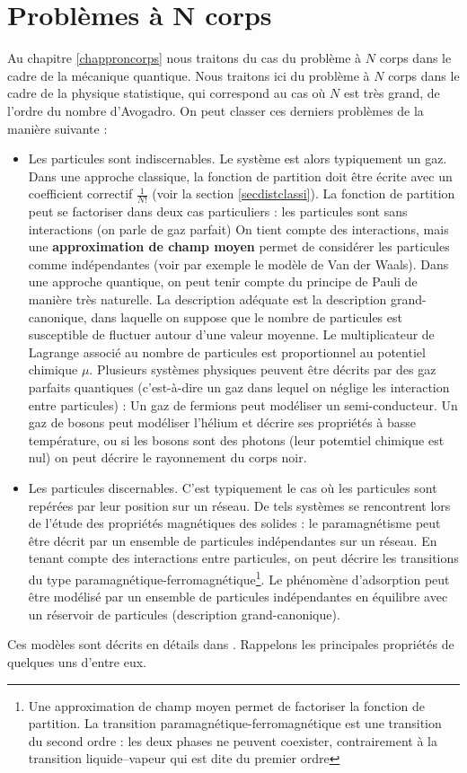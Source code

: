 \documentclass[12pt]{book}
\begin{document}
\section{Probl\`emes \`a N corps}
Au chapitre \ref{chapproncorps} nous traitons du cas du probl\`eme \`a
$N$ corps dans le cadre de la m\'ecanique quantique. Nous traitons ici
du probl\`eme \`a $N$ corps dans le cadre de la physique statistique,
qui correspond au cas o\`u $N$ est tr\`es grand, de l'ordre du nombre
d'Avogadro. On peut classer ces derniers probl\`emes de la mani\`ere
suivante :
 \begin{itemize}
\item Les particules sont indiscernables. Le syst\`eme est alors
typiquement un gaz. Dans une approche classique, la fonction de
partition doit \^etre \'ecrite avec un coefficient correctif
$\frac{1}{N!}$ (voir la section \ref{secdistclassi}). La fonction de
partition peut se factoriser dans deux cas particuliers : 
les particules sont sans interactions (on parle de gaz parfait)
On tient compte des interactions, mais une {\bf approximation de champ
moyen} permet de consid\'erer les particules comme
ind\'ependantes  
(voir par exemple le mod\`ele de Van der Waals).
Dans une approche quantique, on peut tenir compte du principe de Pauli
de mani\`ere tr\`es naturelle. La description ad\'equate est la
description grand-canonique, dans laquelle on suppose que le nombre de
particules est susceptible de fluctuer autour d'une valeur moyenne. Le
multiplicateur de Lagrange associ\'e au nombre de particules est
proportionnel au potentiel chimique $\mu$. Plusieurs syst\`emes
physiques peuvent \^etre d\'ecrits par des gaz parfaits quantiques
(c'est-\`a-dire un gaz dans lequel on n\'eglige les interaction entre
particules) : Un gaz de fermions peut mod\'eliser un semi-conducteur.
Un gaz de bosons peut mod\'eliser l'h\'elium et d\'ecrire ses
propri\'et\'es \`a basse temp\'erature, ou si les bosons sont des
photons (leur potemtiel chimique est nul) on peut d\'ecrire le
rayonnement du corps noir.
\item Les particules discernables. C'est typiquement le cas o\`u les
particules sont rep\'er\'ees par leur position sur un r\'eseau. De tels
syst\`emes se rencontrent lors de l'\'etude des propri\'et\'es
magn\'etiques des solides : le paramagn\'etisme peut \^etre d\'ecrit
par un ensemble de particules ind\'ependantes sur un r\'eseau. En
tenant compte des interactions entre particules, on peut d\'ecrire les
transitions du type paramagn\'etique-ferromagn\'etique\footnote{Une
approximation de champ moyen permet de factoriser la fonction de
partition. La transition paramagn\'etique-ferromagn\'etique est une
transition du second ordre : les deux phases ne peuvent coexister,
contrairement \`a la transition liquide--vapeur qui est dite du
premier ordre}. Le ph\'enom\`ene d'adsorption peut \^etre mod\'elis\'e
par un ensemble de particules ind\'ependantes en \'equilibre avec un
r\'eservoir de particules (description grand-canonique).
\end{itemize}
Ces mod\`eles sont d\'ecrits en d\'etails dans \cite{ph:physt:Diu89}.
Rappelons les principales propri\'et\'es de quelques uns d'entre eux.
\end{document}
